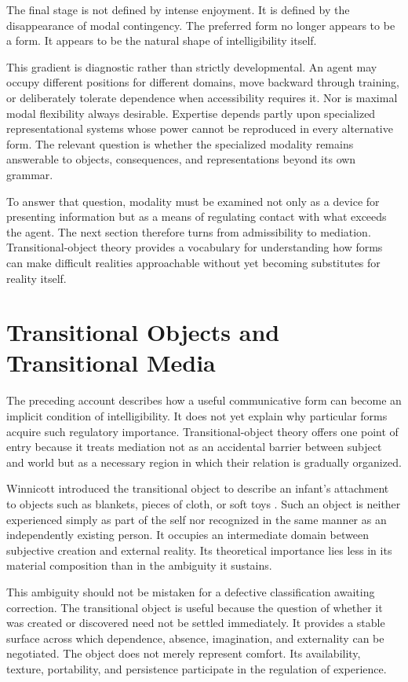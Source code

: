 \documentclass[11pt]{article}
\begin{document}
The final stage is not defined by intense enjoyment. It is defined by the
disappearance of modal contingency. The preferred form no longer appears to
be a form. It appears to be the natural shape of intelligibility itself.

This gradient is diagnostic rather than strictly developmental. An agent may
occupy different positions for different domains, move backward through
training, or deliberately tolerate dependence when accessibility requires
it. Nor is maximal modal flexibility always desirable. Expertise depends
partly upon specialized representational systems whose power cannot be
reproduced in every alternative form. The relevant question is whether the
specialized modality remains answerable to objects, consequences, and
representations beyond its own grammar.

To answer that question, modality must be examined not only as a device for
presenting information but as a means of regulating contact with what exceeds
the agent. The next section therefore turns from admissibility to mediation.
Transitional-object theory provides a vocabulary for understanding how forms
can make difficult realities approachable without yet becoming substitutes
for reality itself.

\section{Transitional Objects and Transitional Media}

The preceding account describes how a useful communicative form can become an
implicit condition of intelligibility. It does not yet explain why particular
forms acquire such regulatory importance. Transitional-object theory offers
one point of entry because it treats mediation not as an accidental barrier
between subject and world but as a necessary region in which their relation is
gradually organized.

Winnicott introduced the transitional object to describe an infant's
attachment to objects such as blankets, pieces of cloth, or soft toys
\citep{winnicott1953}. Such an object is neither experienced simply as part of
the self nor recognized in the same manner as an independently existing
person. It occupies an intermediate domain between subjective creation and
external reality. Its theoretical importance lies less in its material
composition than in the ambiguity it sustains.

This ambiguity should not be mistaken for a defective classification awaiting
correction. The transitional object is useful because the question of whether
it was created or discovered need not be settled immediately. It provides a
stable surface across which dependence, absence, imagination, and externality
can be negotiated. The object does not merely represent comfort. Its
availability, texture, portability, and persistence participate in the
regulation of experience.
\end{document}
